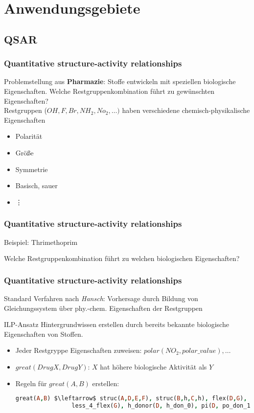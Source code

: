 \section{Anwendungsgebiete}
\subsection{QSAR}
\begin{frame}
	\frametitle{Quantitative structure-activity relationships}
	Problemstellung aus \textbf{Pharmazie}: Stoffe entwickeln mit speziellen biologische Eigenschaften.
	Welche Restgruppenkombination führt zu gewünschten Eigenschaften?\\

	Restgruppen ($OH, F, Br, NH_2, No_2, \ldots)$ haben verschiedene
	chemisch-physikalische Eigenschaften
	\begin{itemize}
		\item Polarität
		\item Größe
		\item Symmetrie
		\item Basisch, sauer
		\item {\hspace{5pt}\vdots}
	\end{itemize}
\end{frame}
\begin{frame}
	\frametitle{Quantitative structure-activity relationships}
	\begin{block}{Beispiel: Thrimethoprim}
	\end{block}
	Welche Restgruppenkombination führt zu welchen biologischen Eigenschaften?
\end{frame}
\begin{frame}[fragile]
	\frametitle{Quantitative structure-activity relationships}
	Standard Verfahren nach \textit{Hansch}: Vorhersage durch Bildung von
	Gleichungssystem über phy.-chem. Eigenschaften der Restgruppen

	\begin{block}{ILP-Ansatz}
	Hintergrundwissen erstellen durch bereits bekannte biologische Eigenschaften
	von Stoffen.
	\begin{itemize}
		\item Jeder Restgryppe Eigenschaften zuweisen: $polar(NO_2, polar\_value), \ldots$
		\item $great(DrugX, DrugY)$: $X$ hat höhere biologische Aktivität als $Y$
		\item Regeln für $great(A,B)$ erstellen: 
			\begin{lstlisting}[language=prolog]
				great(A,B) $\leftarrow$ struc(A,D,E,F), struc(B,h,C,h), flex(D,G),
				less_4_flex(G), h_donor(D, h_don_0), pi(D, po_don_1).
			\end{lstlisting}
	\end{itemize}
	\end{block}
\end{frame}

